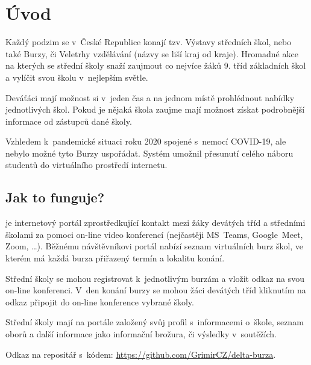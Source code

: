 \chapter*{Úvod}

Každý podzim se v~České Republice konají tzv. Výstavy středních škol, nebo také Burzy, či Veletrhy vzdělávání (názvy se liší kraj od kraje).
Hromadné akce na kterých se střední školy snaží zaujmout co nejvíce žáků 9. tříd základních škol a vylíčit svou školu v~nejlepším světle.

Deváťáci mají možnost si v~jeden čas a na jednom místě prohlédnout nabídky jednotlivých škol. Pokud je nějaká škola zaujme mají možnost získat podrobnější informace od zástupců dané školy. 

Vzhledem k~pandemické situaci roku 2020 spojené s~nemocí COVID-19, ale nebylo možné tyto Burzy uspořádat. Systém \bso{} umožnil přesunutí celého náboru studentů do virtuálního prostředí internetu.

\section*{Jak to funguje?}
\bso{} je internetový portál zprostředkující kontakt mezi žáky devátých tříd a středními školami za pomoci on-line video konferencí (nejčastěji MS~Teams\cite{ms-teams}, Google~Meet\cite{google-meet}, Zoom\cite{zoom}, \ldots). 
Běžnému návštěvníkovi portál nabízí seznam virtuálních burz škol, ve kterém má každá burza přiřazený termín a lokalitu konání.

Střední školy se mohou registrovat k~jednotlivým burzám a vložit odkaz na svou on-line konferenci. V~den konání burzy se mohou žáci devátých tříd kliknutím na odkaz připojit do on-line konference vybrané školy.

Střední školy mají na portále založený svůj profil s~informacemi o~škole, seznam oborů a další informace jako informační brožura, či výsledky v~soutěžích.

Odkaz na repositář s~kódem: \href{https://github.com/GrimirCZ/delta-burza}{https://github.com/GrimirCZ/delta-burza}.

\pagebreak

